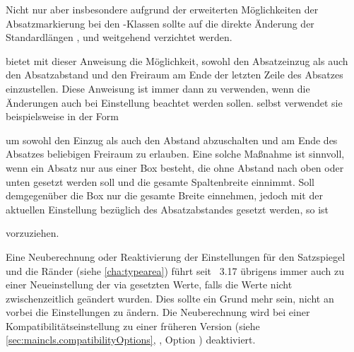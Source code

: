 Nicht nur aber insbesondere aufgrund der erweiterten Möglichkeiten der
Absatzmarkierung bei den \KOMAScript-Klassen sollte auf die direkte Änderung
der Standardlängen ,
 und
 weitgehend verzichtet werden.

\begin{Declaration}
\end{Declaration}
\KOMAScript{} bietet mit dieser Anweisung die Möglichkeit, sowohl den
Absatzeinzug als auch den Absatzabstand und den Freiraum am Ende der letzten
Zeile des Absatzes einzustellen. Diese Anweisung ist immer dann zu verwenden,
wenn die Änderungen auch bei Einstellung
 beachtet werden
sollen. \KOMAScript{} selbst verwendet sie beispielsweise
in der Form
\begin{lstcode}
\end{lstcode}
um sowohl den Einzug als auch den Abstand abzuschalten und am Ende des
Absatzes beliebigen Freiraum zu erlauben. Eine solche Maßnahme ist sinnvoll,
wenn ein Absatz nur aus einer Box besteht, die ohne Abstand nach oben oder
unten gesetzt werden soll und die gesamte Spaltenbreite einnimmt. Soll
demgegenüber die Box nur die gesamte Breite einnehmen, jedoch mit der
aktuellen Einstellung bezüglich des Absatzabstandes gesetzt werden, so ist
\begin{lstcode}
  \setlength{\parfillskip}{0pt plus 1fil}
\end{lstcode}
vorzuziehen.

Eine Neuberechnung oder Reaktivierung
der Einstellungen für den Satzspiegel und die Ränder (siehe
\autoref{cha:typearea}) führt seit \KOMAScript~3.17 übrigens immer auch zu
einer Neueinstellung der via  gesetzten Werte, falls die
Werte nicht zwischenzeitlich geändert wurden. Dies sollte ein Grund mehr sein,
nicht an \KOMAScript{} vorbei die Einstellungen zu ändern. Die Neuberechnung
wird bei einer Kompatibilitätseinstellung zu einer früheren Version (siehe
\autoref{sec:maincls.compatibilityOptions},
, Option
%
)
deaktiviert.%
%
\EndIndexGroup

